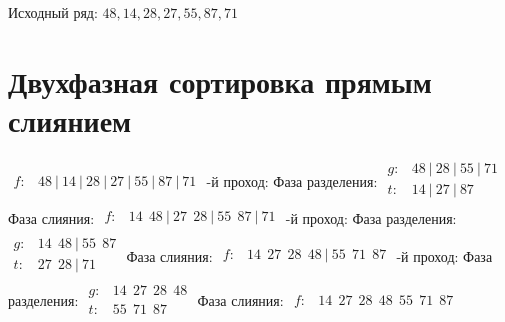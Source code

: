 \documentclass{article}
\begin{document}
Исходный ряд: $48, 14, 28, 27, 55, 87, 71$
\section*{Двухфазная сортировка прямым слиянием}
$\begin{array}{rl}
        f: & 48 ~|~ 14 ~|~ 28 ~|~ 27 ~|~ 55 ~|~ 87 ~|~ 71
    \end{array}$ -й проход: \newline
\indent Фаза разделения:
$\begin{array}{rl}
        g: & 48 ~|~ 28 ~|~ 55 ~|~ 71 \\
        t: & 14 ~|~ 27 ~|~ 87        \\
    \end{array}$ \newline
\indent Фаза слияния:
$\begin{array}{lr}
        f: & 14 ~~ 48 ~|~ 27 ~~ 28 ~|~ 55 ~~ 87 ~|~ 71 \\
    \end{array}$ -й проход: \newline
\indent Фаза разделения:
$\begin{array}{rl}
        g: & 14 ~~ 48 ~|~ 55 ~~ 87 \\
        t: & 27 ~~ 28 ~|~ 71       \\
    \end{array}$ \newline
\indent Фаза слияния:
$\begin{array}{lr}
        f: & 14 ~~ 27 ~~ 28 ~~ 48 ~|~ 55 ~~ 71 ~~ 87 \\
    \end{array}$ -й проход: \newline
\indent Фаза разделения:
$\begin{array}{rl}
        g: & 14 ~~ 27 ~~ 28 ~~ 48 \\
        t: & 55 ~~ 71 ~~ 87       \\
    \end{array}$ \newline
\indent Фаза слияния:
$\begin{array}{lr}
        f: & 14 ~~ 27 ~~ 28 ~~ 48 ~~ 55 ~~ 71 ~~ 87 \\
    \end{array}$ \newline
\end{document}
